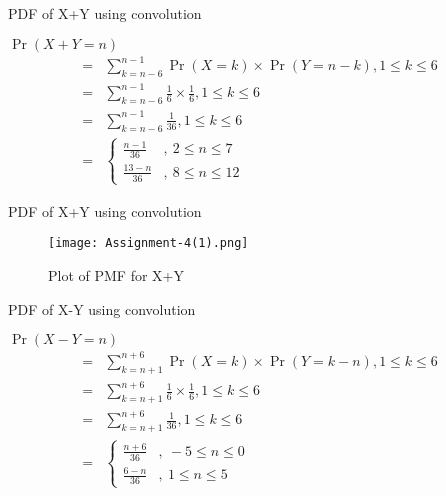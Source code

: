 \documentclass{beamer}
\providecommand{\brak}[1]{\ensuremath{\left(#1\right)}}
\begin{document}
\begin{frame}{PDF of X+Y using convolution}
    \begin{block}{}
        $\Pr\brak{X+Y=n}$
        \begin{align}
            =&\sum_{k=n-6}^{n-1} \Pr\brak{X=k}\times\Pr\brak{Y=n-k}, 1\leq k \leq 6\\
            =&\sum_{k=n-6}^{n-1} \frac{1}{6}\times\frac{1}{6}, 1\leq k \leq 6\\
            =&\sum_{k=n-6}^{n-1} \frac{1}{36}, 1\leq k \leq 6\label{0.0.12}\\
            =&
            \left\{
	        \begin{array}{ll}
		        \frac{n-1}{36}  & ,\: 2 \leq n \leq 7 \\
		        \frac{13-n}{36} & ,\: 8 \leq n \leq 12
	        \end{array}
            \right.
        \end{align}
    \end{block}
\end{frame}

\begin{frame}{PDF of X+Y using convolution}
    \begin{figure}[htb]
        \texttt{[image: Assignment-4(1).png]}
        \caption{Plot of PMF for X+Y}
    \end{figure}
\end{frame}

\begin{frame}{PDF of X-Y using convolution}
    \begin{block}{}
        $\Pr\brak{X-Y=n}$
        \begin{align}
            =&\sum_{k=n+1}^{n+6} \Pr\brak{X=k}\times\Pr\brak{Y=k-n}, 1\leq k \leq 6\\
            =&\sum_{k=n+1}^{n+6} \frac{1}{6}\times\frac{1}{6}, 1\leq k \leq 6\\
            =&\sum_{k=n+1}^{n+6} \frac{1}{36}, 1\leq k \leq 6\label{0.0.16}\\
            =&
            \left\{
	        \begin{array}{ll}
		        \frac{n+6}{36} & ,\: -5 \leq n \leq 0 \\
		        \frac{6-n}{36} & ,\: 1  \leq n \leq 5
	        \end{array}
            \right.
        \end{align}
    \end{block}
\end{frame}
\end{document}
